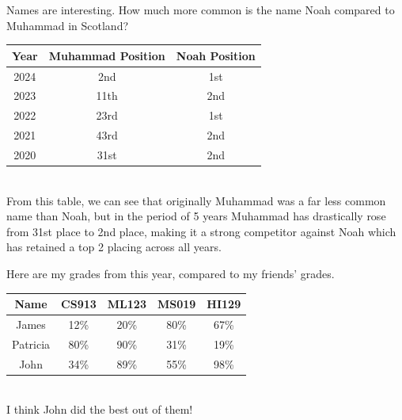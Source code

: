 \documentclass[draft]{article}
\begin{document}
Names are interesting. How much more common is the name Noah compared to Muhammad in Scotland?\\
\begin{tabular}{ccc} %
	Year & Muhammad Position & Noah Position \\\hline
	2024 & 2nd & 1st \\
	2023 & 11th & 2nd \\
	2022 & 23rd & 1st \\
	2021 & 43rd & 2nd \\
	2020 & 31st & 2nd \\
\end{tabular}\\
From this table, we can see that originally Muhammad was a far less common name than Noah, but in the period of 5 years Muhammad has drastically rose from 31st place to 2nd place, making it a strong competitor against Noah which has retained a top 2 placing across all years.

Here are my grades from this year, compared to my friends' grades.\\
\begin{tabular}{ccccc} %
	Name & CS913 & ML123 & MS019 & HI129 \\\hline
	James & 12\% & 20\% & 80\% & 67\% \\
	Patricia & 80\% & 90\% & 31\% & 19\% \\
	John & 34\% & 89\% & 55\% & 98\%
\end{tabular}\\
I think John did the best out of them!
\end{document}
